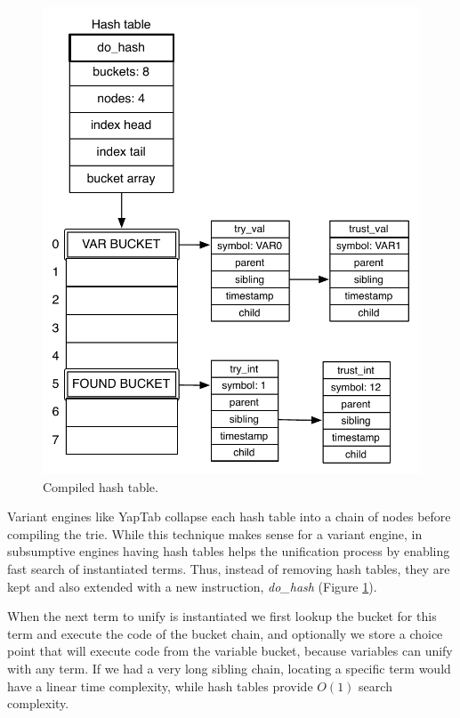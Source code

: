 \begin{figure}[H]
  \centering
    \includegraphics[scale=0.6]{compiled_hash.pdf}
  \caption{Compiled hash table.}
  \label{fig:compiled_hash}
\end{figure}

Variant engines like YapTab collapse each hash table into a chain of nodes before compiling
the trie. While this technique makes sense for a variant engine, in subsumptive engines
having hash tables helps the unification process by enabling fast search of instantiated terms.
Thus, instead of removing hash tables, they are kept and also extended with a new instruction,
\textit{do\_hash} (Figure \ref{fig:compiled_hash}).

When the next term to unify is instantiated we first lookup the bucket for this
term and execute the code of the bucket chain, and optionally we store a choice point that will
execute code from the variable bucket, because variables can unify with any term. If we had
a very long sibling chain, locating a specific term would have a linear time complexity, while
hash tables provide $O(1)$ search complexity.

